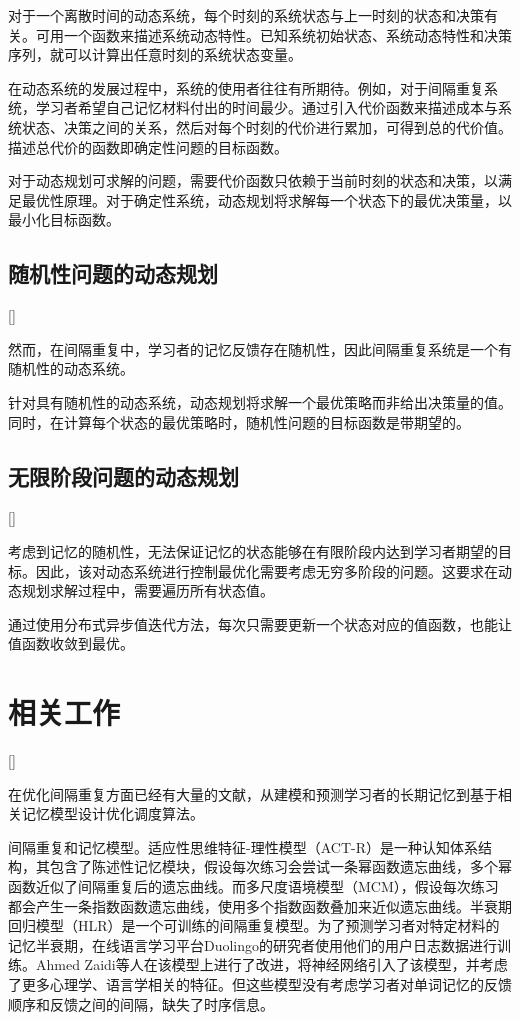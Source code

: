 对于一个离散时间的动态系统，每个时刻的系统状态与上一时刻的状态和决策有关。可用一个函数来描述系统动态特性。已知系统初始状态、系统动态特性和决策序列，就可以计算出任意时刻的系统状态变量\cite[2-4]{bertsekasReinforcementLearningOptimal2019}。

在动态系统的发展过程中，系统的使用者往往有所期待。例如，对于间隔重复系统，学习者希望自己记忆材料付出的时间最少。通过引入代价函数来描述成本与系统状态、决策之间的关系，然后对每个时刻的代价进行累加，可得到总的代价值。描述总代价的函数即确定性问题的目标函数。

对于动态规划可求解的问题，需要代价函数只依赖于当前时刻的状态和决策，以满足最优性原理。对于确定性系统，动态规划将求解每一个状态下的最优决策量，以最小化目标函数。

\subsection{随机性问题的动态规划}[]

然而，在间隔重复中，学习者的记忆反馈存在随机性，因此间隔重复系统是一个有随机性的动态系统。

针对具有随机性的动态系统，动态规划将求解一个最优策略而非给出决策量的值。同时，在计算每个状态的最优策略时，随机性问题的目标函数是带期望的\cite[14-16]{bertsekasReinforcementLearningOptimal2019}。

\subsection{无限阶段问题的动态规划}[]

考虑到记忆的随机性，无法保证记忆的状态能够在有限阶段内达到学习者期望的目标。因此，该对动态系统进行控制最优化需要考虑无穷多阶段的问题。这要求在动态规划求解过程中，需要遍历所有状态值。

通过使用分布式异步值迭代方法，每次只需要更新一个状态对应的值函数，也能让值函数收敛到最优\cite[197-200]{bertsekasReinforcementLearningOptimal2019}。

\section{相关工作}[]

在优化间隔重复方面已经有大量的文献，从建模和预测学习者的长期记忆到基于相关记忆模型设计优化调度算法。

间隔重复和记忆模型。适应性思维特征-理性模型（ACT-R）\cite{andersonIntegratedTheoryMind2004}是一种认知体系结构，其包含了陈述性记忆模块，假设每次练习会尝试一条幂函数遗忘曲线，多个幂函数近似了间隔重复后的遗忘曲线。而多尺度语境模型（MCM）\cite{pashlerPredictingOptimalSpacing2009}，假设每次练习都会产生一条指数函数遗忘曲线，使用多个指数函数叠加来近似遗忘曲线。半衰期回归模型（HLR）\cite{settlesTrainableSpacedRepetition2016}是一个可训练的间隔重复模型。为了预测学习者对特定材料的记忆半衰期，在线语言学习平台Duolingo的研究者使用他们的用户日志数据进行训练。Ahmed Zaidi等人\cite{zaidiAdaptiveForgettingCurves2020}在该模型上进行了改进，将神经网络引入了该模型，并考虑了更多心理学、语言学相关的特征。但这些模型没有考虑学习者对单词记忆的反馈顺序和反馈之间的间隔，缺失了时序信息。

